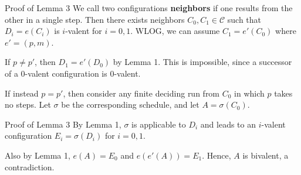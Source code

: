 \documentclass[12pt]{beamer}
\begin{document}
  \begin{frame}{Proof of Lemma 3}
    We call two configurations \textbf{neighbors} if one results from the other
    in a single step. Then there exists neighbors \(C_0, C_1\in\mathcal{C}\)
    such that \(D_i = e(C_i)\) is \(i\)-valent for \(i = 0,1\). WLOG, we can
    assume \(C_1 = e'(C_0)\) where \(e' = (p, m)\).

    \vspace{0.25cm}

    If \(p \neq p'\), then \(D_1 = e'(D_0)\) by Lemma 1. This is impossible,
    since a successor of a \(0\)-valent configuration is \(0\)-valent.

    \vspace{0.25cm}

    If instead \(p = p'\), then consider any finite deciding run from \(C_0\)
    in which \(p\) takes no steps. Let \(\sigma\) be the corresponding
    schedule, and let \(A = \sigma(C_0)\).
  \end{frame}

  \begin{frame}{Proof of Lemma 3}
    By Lemma 1, \(\sigma\) is applicable to \(D_i\) and leads to an
    \(i\)-valent configuration \(E_i = \sigma(D_i)\) for \(i = 0,1\).

    \vspace{0.25cm}

    Also by Lemma 1, \(e(A) = E_0\) and \(e(e'(A)) = E_1\). Hence, \(A\) is
    bivalent, a contradiction.

    \vspace{0.25cm}

    \begin{figure}
    \end{figure}
  \end{frame}
\end{document}
